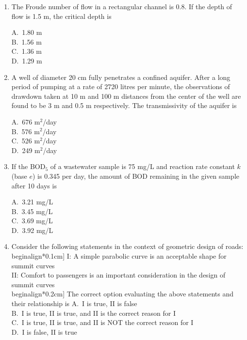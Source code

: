 \documentclass[journal,12pt,onecolumn]{exam}
\theoremstyle{remark}
\begin{document}
\begin{enumerate}
\noindent\item The Froude number of flow in a rectangular channel is 0.8. If the depth of flow is 1.5 m, the critical depth is
\hfill{}
\begin{multicols}{4}
A.\ 1.80 m \\
B.\ 1.56 m \\
C.\ 1.36 m \\
D.\ 1.29 m
\end{multicols}

\noindent\item A well of diameter 20 cm fully penetrates a confined aquifer. After a long period of pumping at a rate of 2720 litres per minute, the observations of drawdown taken at 10 m and 100 m distances from the center of the well are found to be 3 m and 0.5 m respectively. The transmissivity of the aquifer is
\hfill{}
\begin{multicols}{4}
A.\ 676 m$^2$/day \\
B.\ 576 m$^2$/day \\
C.\ 526 m$^2$/day \\
D.\ 249 m$^2$/day
\end{multicols}

\noindent\item If the BOD$_5$ of a wastewater sample is 75 mg/L and reaction rate constant $k$ (base $e$) is 0.345 per day, the amount of BOD remaining in the given sample after 10 days is
\hfill{}
\begin{multicols}{4}
A.\ 3.21 mg/L \\
B.\ 3.45 mg/L \\
C.\ 3.69 mg/L \\
D.\ 3.92 mg/L
\end{multicols}

\noindent\item Consider the following statements in the context of geometric design of roads: \\begin{align*}0.1cm]
I: A simple parabolic curve is an acceptable shape for summit curves \\ 
II: Comfort to passengers is an important consideration in the design of summit curves \\begin{align*}0.2cm]
The correct option evaluating the above statements and their relationship is
\hfill{}\newline
A.\ I is true, II is false \\
B.\ I is true, II is true, and II is the correct reason for I \\
C.\ I is true, II is true, and II is NOT the correct reason for I \\
D.\ I is false, II is true


\end{enumerate}
\end{document}
